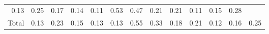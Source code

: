 \begin{table}[!h]
\begin{tabular}{lllllllllllll}
  \multicolumn{1}{|r}{0.13} &
  \multicolumn{1}{r}{0.25} &
  \multicolumn{1}{r}{0.17} &
  \multicolumn{1}{r}{0.14} &
  \multicolumn{1}{r}{0.11} &
  \multicolumn{1}{r}{0.53} &
  \multicolumn{1}{r}{0.47} &
  \multicolumn{1}{r}{0.21} &
  \multicolumn{1}{r}{0.21} &
  \multicolumn{1}{r}{0.11} &
  \multicolumn{1}{r}{0.15} &
  \multicolumn{1}{r}{0.28} \\
\multicolumn{1}{l}{\hspace{1em}Total} &
  \multicolumn{1}{|r}{0.13} &
  \multicolumn{1}{r}{0.23} &
  \multicolumn{1}{r}{0.15} &
  \multicolumn{1}{r}{0.13} &
  \multicolumn{1}{r}{0.13} &
  \multicolumn{1}{r}{0.55} &
  \multicolumn{1}{r}{0.33} &
  \multicolumn{1}{r}{0.18} &
  \multicolumn{1}{r}{0.21} &
  \multicolumn{1}{r}{0.12} &
  \multicolumn{1}{r}{0.16} &
  \multicolumn{1}{r}{0.25} \\
\cline{1-13}
\end{tabular}
\end{table}
